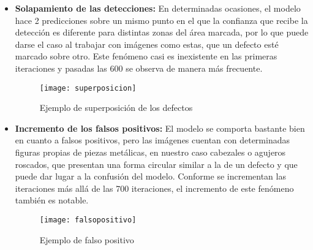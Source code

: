 \begin{itemize}
    \item \textbf{Solapamiento de las detecciones:} En determinadas ocasiones, el modelo hace 2 predicciones sobre un mismo punto en el que la confianza que recibe la detección es diferente para distintas zonas del área marcada, por lo que puede darse el caso al trabajar con imágenes como estas, que un defecto esté marcado sobre otro. Este fenómeno casi es inexistente en las primeras iteraciones y pasadas las 600 se observa de manera más frecuente.
    
    \begin{figure}[htb]
    \centering
    \texttt{[image: superposicion]}
    \caption[Ejemplo de superposición de los defectos]{Ejemplo de superposición de los defectos}
    \end{figure}
    
\clearpage
    
    \item \textbf{Incremento de los falsos positivos:} El modelo se comporta bastante bien en cuanto a falsos positivos, pero las imágenes cuentan con determinadas figuras propias de piezas metálicas, en nuestro caso cabezales o agujeros roscados, que presentan una forma circular similar a la de un defecto y que puede dar lugar a la confusión del modelo. Conforme se incrementan las iteraciones más allá de las 700 iteraciones, el incremento de este fenómeno también es notable.
    
    \begin{figure}[htb]
    \centering
    \texttt{[image: falsopositivo]}
    \caption[Ejemplo de falso positivo]{Ejemplo de falso positivo}
    \end{figure}
    
\end{itemize}
